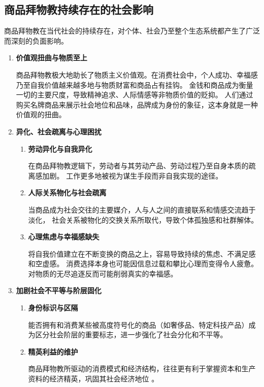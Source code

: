 \subsection{商品拜物教持续存在的社会影响}
商品拜物教在当代社会的持续存在，对个体、社会乃至整个生态系统都产生了广泛而深刻的负面影响。

\begin{enumerate}
    \item \textbf{价值观扭曲与物质至上}

    商品拜物教极大地助长了物质主义价值观。在消费社会中，个人成功、幸福感乃至自我价值越来越多地与物质财富和商品占有挂钩。
    金钱和商品成为衡量一切的主要尺度，导致精神追求、人际情感等非物质价值的贬抑。
    人们通过购买名牌商品来展示社会地位和品味，品牌成为身份的象征，这本身就是一种价值观的扭曲。

    \item \textbf{异化、社会疏离与心理困扰}

        \begin{enumerate}
            \item \textbf{劳动异化与自我异化}

            在商品拜物教逻辑下，劳动者与其劳动产品、劳动过程乃至自身本质的疏离感加剧。
            工作更多地被视为谋生手段而非自我实现的途径。
            \item \textbf{人际关系物化与社会疏离}

            当商品成为社会交往的主要媒介，人与人之间的直接联系和情感交流趋于淡化，
            社会关系被物化的交换关系所取代，导致个体孤独感和社群解体。
            \item \textbf{心理焦虑与幸福感缺失}

            将自我价值建立在不断变换的商品之上，容易导致持续的焦虑、不满足感和空虚感。
            消费选择本身也可能因信息过载和攀比心理而变得令人疲惫。对物质的无尽追逐反而可能削弱真实的幸福感\autocite{mjw}。
        \end{enumerate}

    \item \textbf{加剧社会不平等与阶层固化}
        \begin{enumerate}
            \item \textbf{身份标识与区隔}

            能否拥有和消费某些被高度符号化的商品（如奢侈品、特定科技产品）成为区分社会阶层的重要标志，进一步强化了社会分化和不平等。
            \item \textbf{精英利益的维护}

            商品拜物教所驱动的消费模式和经济结构，往往更有利于掌握资本和生产资料的经济精英，巩固其社会经济地位 。
        \end{enumerate}
\end{enumerate}
